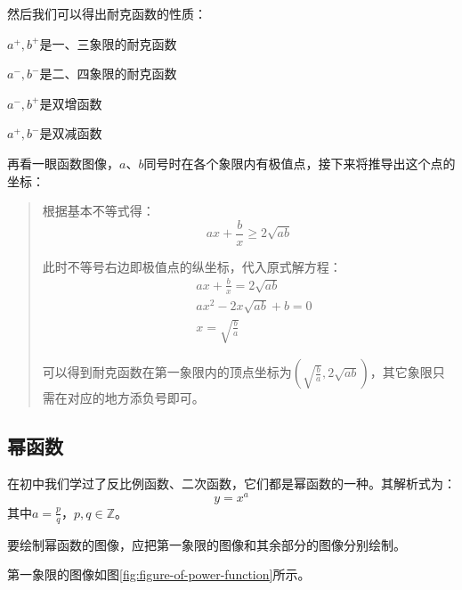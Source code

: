 然后我们可以得出耐克函数的性质：

\begin{itemlist}
	\item $a^+,b^+$是一、三象限的耐克函数
	\item $a^-,b^-$是二、四象限的耐克函数
	\item $a^-,b^+$是双增函数
	\item $a^+,b^-$是双减函数
\end{itemlist}

再看一眼函数图像，$a$、$b$同号时在各个象限内有极值点，接下来将推导出这个点的坐标：

\begin{quote}
	根据基本不等式得：\[ax+\frac{b}{x}\geq2\sqrt{ab}\]

	此时不等号右边即极值点的纵坐标，代入原式解方程：
	\[\begin{split}
		&ax+\frac{b}{x}=2\sqrt{ab} \\
		&ax^2-2x\sqrt{ab}+b=0 \\
		&x=\sqrt{\frac{b}{a}}
	\end{split}\]

	可以得到耐克函数在第一象限内的顶点坐标为$(\sqrt{\frac{b}{a}},2\sqrt{ab})$，其它象限只需在对应的地方添负号即可。
\end{quote}

\subsection{幂函数}
在初中我们学过了反比例函数、二次函数，它们都是幂函数的一种。其解析式为：\[y=x^a\]其中$a=\frac{p}{q}$，$p,q\in\mathbb{Z}$。

要绘制幂函数的图像，应把第一象限的图像和其余部分的图像分别绘制。

第一象限的图像如图\ref{fig:figure-of-power-function}所示。

